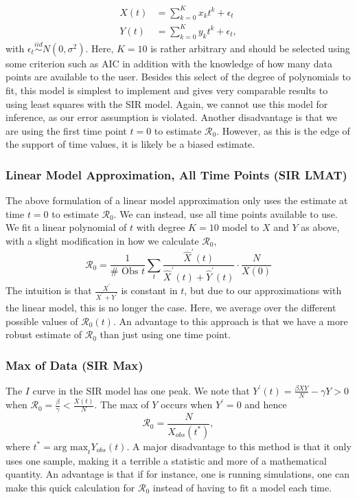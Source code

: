 \documentclass[12pt]{article}
\newcommand{\rr}{\ensuremath{\mathcal{R}_0}}
\begin{document}
\begin{align*}
X(t) &= \sum_{k=0}^K x_k t^k + \epsilon_t\\
  {Y}(t) &= \sum_{k=0}^K y_k t^k + \epsilon_t,
\end{align*}
with $\epsilon_t \overset{iid}{\sim} N(0, \sigma^2)$.  Here, $K=10$ is rather arbitrary and should be selected using some criterion such as AIC in addition with the knowledge of how many data points are available to the user.  Besides this select of the degree of polynomials to fit, this model is simplest to implement and gives very comparable results to using least squares with the SIR model.  Again, we cannot use this model for inference, as our error assumption is violated.  Another disadvantage is that we are using the first time point $t=0$ to estimate $\rr$.  However, as this is the edge of the support of time values, it is likely be a biased estimate.

\subsubsection{Linear Model Approximation, All Time Points (SIR LMAT)}\label{linear-model-approximation-all-time-points-degree-10}

The above formulation of a linear model approximation only uses the estimate at time $t=0$ to estimate $\rr$.  We can instead, use all time points available to use.  We fit a linear polynomial of \(t\) with degree \(K= 10\) model to \(X\)
and \(Y\) as above, with a slight modification in how we calculate
\(\rr\),
\[\rr = \frac{1}{\# \text{ Obs }t}\sum_t \frac{\hat{X}^\prime(t)}{ \hat{X}^\prime(t) + \hat{Y}^\prime(t)} \cdot \frac{N}{X(0)} \]
The intuition is that $\frac{X^\prime}{X^\prime + Y^\prime}$ is constant in $t$, but due to our approximations with the linear model, this is no longer the case.  Here, we average over the different possible values of $\rr(t)$.  An advantage to this approach is that we have a more robust estimate of $\rr$ than just using one time point. 

\subsubsection{Max of Data (SIR Max)}\label{max-of-data}
The $I$ curve in the SIR model has one peak.    We note that \(Y^\prime(t) = \frac{\beta XY}{N} - \gamma Y > 0\) when \(\rr = \frac{\beta}{\gamma} < \frac{X(t)}{N}\). The max
of \(Y\) occurs when \(Y^\prime = 0\) and hence
\[\rr = \frac{N}{X_{obs}(t^*)},\] where
\(t^* = \text{arg max}_{t} Y_{obs}(t)\).   A major disadvantage to this method is that it only uses one sample, making it a terrible a statistic and more of a mathematical quantity.  An advantage is that if for instance, one is running simulations, one can make this quick calculation for $\rr$ instead of having to fit a model each time.
\end{document}
